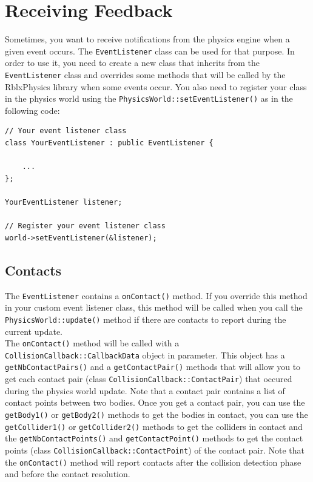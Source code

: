 \documentclass[a4paper,12pt]{article}
\begin{document}
    \section{Receiving Feedback}
    \label{sec:receiving_feedback}

    Sometimes, you want to receive notifications from the physics engine when a given event occurs. The \texttt{EventListener} class can be used for that
    purpose. In order to use it, you need to create a new class that inherits from the \texttt{EventListener} class and overrides some methods that will
    be called by the RblxPhysics library when some events occur. You also need to register your class in the physics world using the
    \texttt{PhysicsWorld::setEventListener()} as in the following code: \\

    \begin{lstlisting}
// Your event listener class
class YourEventListener : public EventListener {

	...
};

YourEventListener listener;

// Register your event listener class
world->setEventListener(&listener);
  \end{lstlisting}

    \subsection{Contacts}

    \begin{sloppypar}
    The \texttt{EventListener} contains a \texttt{onContact()} method. If you override this method in your custom event listener class, this method will
    be called when you call the \texttt{PhysicsWorld::update()} method if there are contacts to report during the current update. \\

    The \texttt{onContact()} method will be called with a \texttt{CollisionCallback::CallbackData} object in parameter. This object has a
    \texttt{getNbContactPairs()} and a \texttt{getContactPair()} methods that will allow you to get each contact pair (class
    \texttt{CollisionCallback::ContactPair}) that occured during the physics world update. Note that a contact pair contains a list of contact
    points between two bodies. Once you get a contact pair, you can use the \texttt{getBody1()} or \texttt{getBody2()} methods to get the bodies in
    contact, you can use the \texttt{getCollider1()} or \texttt{getCollider2()} methods to get the colliders in contact and the
    \texttt{getNbContactPoints()} and \texttt{getContactPoint()} methods to get the contact points (class \texttt{CollisionCallback::ContactPoint}) 
    of the contact pair. Note that the \texttt{onContact()} method will report contacts after the collision detection phase and before the contact
    resolution. \\
    \end{sloppypar}
\end{document}
